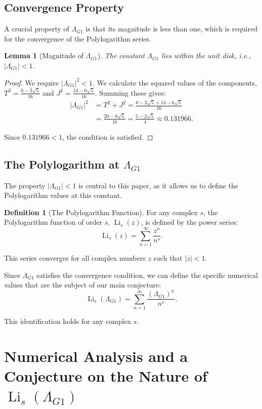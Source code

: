 \documentclass{amsart}
\theoremstyle{plain}
\newtheorem{lemma}[theorem]{Lemma}
\theoremstyle{definition}
\newtheorem{definition}[theorem]{Definition}
\theoremstyle{remark}
\DeclareMathOperator{\Li}{Li}
\newcommand{\LambdaG}{\Lambda_{G1}}
\begin{document}
\subsection{Convergence Property}
A crucial property of $\LambdaG$ is that its magnitude is less than one, which is required for the convergence of the Polylogarithm series.
\begin{lemma}[Magnitude of $\LambdaG$]
\label{lem:convergence}
The constant $\LambdaG$ lies within the unit disk, i.e., $|\LambdaG| < 1$.
\end{lemma}
\begin{proof}
We require $|\LambdaG|^2 < 1$. We calculate the squared values of the components, $T^2 = \frac{6-2\sqrt{5}}{16}$ and $J^2 = \frac{14-6\sqrt{5}}{16}$. Summing these gives:
\begin{align*}
    |\LambdaG|^2 &= T^2+J^2 = \frac{6-2\sqrt{5} + 14-6\sqrt{5}}{16} \\
                 &= \frac{20-8\sqrt{5}}{16} = \frac{5-2\sqrt{5}}{4} \approx 0.131966.
\end{align*}

Since $0.131966 < 1$, the condition is satisfied.
\end{proof}

\subsection{The Polylogarithm at \texorpdfstring{$\LambdaG$}{Lambda\_G1}}
The property $|\LambdaG| < 1$ is central to this paper, as it allows us to define the Polylogarithm values at this constant.
\begin{definition}[The Polylogarithm Function]
For any complex $s$, the Polylogarithm function of order $s$, $\Li_s(z)$, is defined by the power series:
\[ \Li_s(z) = \sum_{n=1}^{\infty} \frac{z^n}{n^s}. \]

This series converges for all complex numbers $z$ such that $|z|<1$.
\end{definition}

Since $\LambdaG$ satisfies the convergence condition, we can define the specific numerical values that are the subject of our main conjecture:
\[ \Li_s(\LambdaG) = \sum_{n=1}^{\infty} \frac{(\LambdaG)^{n}}{n^s}. \]

This identification holds for any complex $s$.

\section{Numerical Analysis and a Conjecture on the Nature of \texorpdfstring{$\Li_s(\LambdaG)$}{Li\_s(Lambda\_G1)}}
\end{document}
